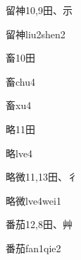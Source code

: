 \begin{entry}{留神}{10,9}{⽥、⽰}
  \begin{phonetics}{留神}{liu2shen2}
  \end{phonetics}
\end{entry}

\begin{entry}{畜}{10}{⽥}
  \begin{phonetics}{畜}{chu4}
  \end{phonetics}
  \begin{phonetics}{畜}{xu4}
  \end{phonetics}
\end{entry}

\begin{entry}{略}{11}{⽥}
  \begin{phonetics}{略}{lve4}
  \end{phonetics}
\end{entry}

\begin{entry}{略微}{11,13}{⽥、⼻}
  \begin{phonetics}{略微}{lve4wei1}
  \end{phonetics}
\end{entry}

\begin{entry}{番茄}{12,8}{⽥、⾋}
  \begin{phonetics}{番茄}{fan1qie2}
  \end{phonetics}
\end{entry}



